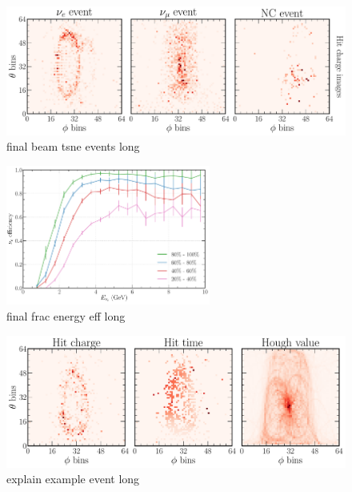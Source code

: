 \begin{figure} %
    \includegraphics[width=\textwidth]{diagrams/7-cvn/chipsnet/final_beam_tsne_events.pdf}
    \caption[final beam tsne events short]
    {final beam tsne events long}
    \label{fig:final_beam_tsne_events}
\end{figure}

\begin{figure} %
    \includegraphics[width=0.6\textwidth]{diagrams/7-cvn/chipsnet/final_frac_energy_eff.pdf}
    \caption[final frac energy eff short]
    {final frac energy eff long}
    \label{fig:final_frac_energy_eff}
\end{figure}

\begin{figure} %
    \includegraphics[width=\textwidth]{diagrams/7-cvn/chipsnet/explain_example_event.pdf}
    \caption[explain example event short]
    {explain example event long}
    \label{fig:explain_example_event}
\end{figure}

